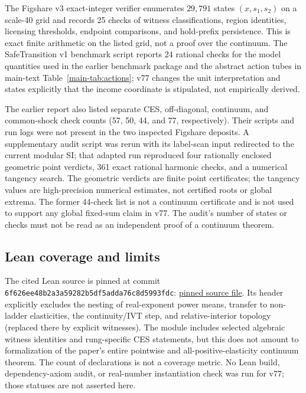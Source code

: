 The Figshare v3 exact-integer verifier enumerates $29{,}791$ states $(x,s_1,s_2)$ on a scale-40 grid and records 25 checks of witness classifications, region identities, licensing thresholds, endpoint comparisons, and hold-prefix persistence. This is exact finite arithmetic on the listed grid, not a proof over the continuum. The SafeTransition v1 benchmark script reports 24 rational checks for the model quantities used in the earlier benchmark package and the abstract action tubes in main-text Table~\ref{main-tab:actions}; v77 changes the unit interpretation and states explicitly that the income coordinate is stipulated, not empirically derived.

The earlier report also listed separate CES, off-diagonal, continuum, and common-shock check counts (57, 50, 44, and 77, respectively). Their scripts and run logs were not present in the two inspected Figshare deposits. A supplementary audit script was rerun with its label-scan input redirected to the current modular SI; that adapted run reproduced four rationally enclosed geometric point verdicts, 361 exact rational harmonic checks, and a numerical tangency search. The geometric verdicts are finite point certificates; the tangency values are high-precision numerical estimates, not certified roots or global extrema. The former 44-check list is not a continuum certificate and is not used to support any global fixed-sum claim in v77. The audit's number of states or checks must not be read as an independent proof of a continuum theorem.

\subsection{Lean coverage and limits}

The cited Lean source is pinned at commit \texttt{6f626ee4\allowbreak 8b2a3a59\allowbreak 282b5df5\allowbreak adda76c8\allowbreak d5993fdc}: \href{https://github.com/MIKEAA2020/general-sustainability/blob/6f626ee48b2a3a59282b5df5adda76c8d5993fdc/lean/Formalizations/P1_AssessmentSeparation.lean}{pinned source file}. Its header explicitly excludes the nesting of real-exponent power means, transfer to non-ladder elasticities, the continuity/IVT step, and relative-interior topology (replaced there by explicit witnesses). The module includes selected algebraic witness identities and rung-specific CES statements, but this does not amount to formalization of the paper's entire pointwise and all-positive-elasticity continuum theorem. The count of declarations is not a coverage metric. No Lean build, dependency-axiom audit, or real-number instantiation check was run for v77; those statuses are not asserted here.

